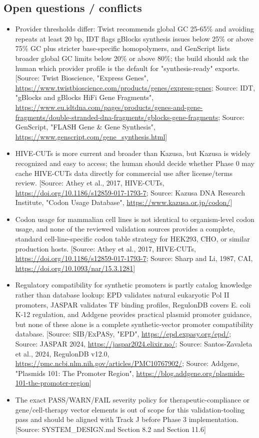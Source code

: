 \documentclass[11pt]{report}
\begin{document}
\subsection{Open questions / conflicts}
\begin{itemize}
\item Provider thresholds differ: Twist recommends global GC 25-65\% and avoiding repeats at least 20 bp, IDT flags gBlocks synthesis issues below 25\% or above 75\% GC plus stricter base-specific homopolymers, and GenScript lists broader global GC limits below 20\% or above 80\%; the build should ask the human which provider profile is the default for "synthesis-ready" exports. [Source: Twist Bioscience, "Express Genes", \url{https://www.twistbioscience.com/products/genes/express-genes}; Source: IDT, "gBlocks and gBlocks HiFi Gene Fragments", \url{https://www.eu.idtdna.com/pages/products/genes-and-gene-fragments/double-stranded-dna-fragments/gblocks-gene-fragments}; Source: GenScript, "FLASH Gene \& Gene Synthesis", \url{https://www.genscript.com/gene_synthesis.html}]
\item HIVE-CUTs is more current and broader than Kazusa, but Kazusa is widely recognized and easy to access; the human should decide whether Phase 0 may cache HIVE-CUTs data directly for commercial use after license/terms review. [Source: Athey et al., 2017, HIVE-CUTs, \url{https://doi.org/10.1186/s12859-017-1793-7}; Source: Kazusa DNA Research Institute, "Codon Usage Database", \url{https://www.kazusa.or.jp/codon/}]
\item Codon usage for mammalian cell lines is not identical to organism-level codon usage, and none of the reviewed validation sources provides a complete, standard cell-line-specific codon table strategy for HEK293, CHO, or similar production hosts. [Source: Athey et al., 2017, HIVE-CUTs, \url{https://doi.org/10.1186/s12859-017-1793-7}; Source: Sharp and Li, 1987, CAI, \url{https://doi.org/10.1093/nar/15.3.1281}]
\item Regulatory compatibility for synthetic promoters is partly catalog knowledge rather than database lookup: EPD validates natural eukaryotic Pol II promoters, JASPAR validates TF binding profiles, RegulonDB covers E. coli K-12 regulation, and Addgene provides practical plasmid promoter guidance, but none of these alone is a complete synthetic-vector promoter compatibility database. [Source: SIB/ExPASy, "EPD", \url{https://epd.expasy.org/epd/}; Source: JASPAR 2024, \url{https://jaspar2024.elixir.no/}; Source: Santos-Zavaleta et al., 2024, RegulonDB v12.0, \url{https://pmc.ncbi.nlm.nih.gov/articles/PMC10767902/}; Source: Addgene, "Plasmids 101: The Promoter Region", \url{https://blog.addgene.org/plasmids-101-the-promoter-region}]
\item The exact PASS/WARN/FAIL severity policy for therapeutic-compliance or gene/cell-therapy vector elements is out of scope for this validation-tooling pass and should be aligned with Track J before Phase 3 implementation. [Source: SYSTEM\_DESIGN.md Section 8.2 and Section 11.6]
\end{itemize}
\end{document}
